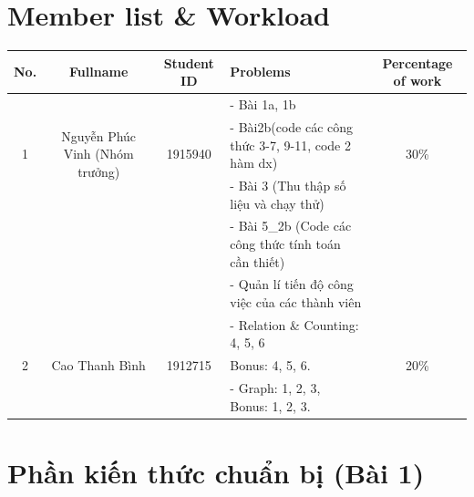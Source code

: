 \documentclass[a4paper]{article}
\begin{document}

\newpage
\tableofcontents
\newpage


\section{Member list \& Workload}

\begin{center}
\begin{tabular}{|c|c|c|l|c|}
\hline
\textbf{No.} & \textbf{Fullname} & \textbf{Student ID} & \textbf{Problems} & \textbf{Percentage of work}\\
\hline 
\multirow{3}{*}{1} & \multirow{3}{*}{Nguyễn Phúc Vinh (Nhóm trưởng)} & \multirow{3}{*}{1915940} & - Bài 1a, 1b &
\multirow{3}{*}{30\%}\\
& &  & - Bài2b(code các công thức 3-7, 9-11, code 2 hàm dx)\\
& &  & - Bài 3 (Thu thập số liệu và chạy thử)\\
& &  & - Bài 5\_2b (Code các công thức tính toán cần thiết)\\
& &  & - Quản lí tiến độ công việc của các thành viên\\
\hline 
\multirow{3}{*}{2} & \multirow{3}{*}{Cao Thanh Bình} & \multirow{3}{*}{1912715} & - Relation \& Counting: 4, 5, 6& \multirow{3}{*}{20\%}\\
 & &  & Bonus: 4, 5, 6. &\\
 & &  & - Graph: 1, 2, 3, Bonus: 1, 2, 3. &\\
\hline
\end{tabular}
\end{center}

\section{Phần kiến thức chuẩn bị (Bài 1)}
\end{document}
